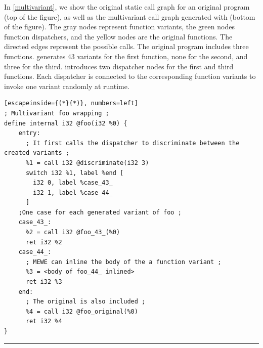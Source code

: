 In \autoref{multivariant}, we show the original static call graph for an original program (top of the figure), as well as the multivariant call graph generated with \tool (bottom of the figure).
The gray nodes represent function variants, the green nodes function dispatchers, and the yellow nodes are the original functions.
The directed edges represent the possible calls.
The original program includes three functions. \tool generates 43 variants for the first function, none for the second, and three for the third. 
\tool introduces two dispatcher nodes for the first and third functions. Each dispatcher is connected to the corresponding function variants to invoke one variant randomly at runtime.


\lstset{
    language=llvm,
    basicstyle=\footnotesize\ttfamily,
    columns=fullflexible,
    breaklines=true,
    numbers=none,
    stepnumber=1,
    float
}

\begin{minipage}[t]{0.9\linewidth}
\scriptsize
\centering
\noindent\begin{minipage}[b]{\linewidth}
    \begin{minipage}[t]{1\linewidth}
        \begin{lstlisting}[escapeinside={(*}{*)}, numbers=left]
; Multivariant foo wrapping ;
define internal i32 @foo(i32 %0) {
    entry:
      ; It first calls the dispatcher to discriminate between the created variants ;
      %1 = call i32 @discriminate(i32 3)
      switch i32 %1, label %end [
        i32 0, label %case_43_
        i32 1, label %case_44_
      ]
    ;One case for each generated variant of foo ;
    case_43_:                 
      %2 = call i32 @foo_43_(%0)
      ret i32 %2
    case_44_:
      ; MEWE can inline the body of the a function variant ;
      %3 = <body of foo_44_ inlined>
      ret i32 %3
    end:                                  
      ; The original is also included ;           
      %4 = call i32 @foo_original(%0)
      ret i32 %4
}
        \end{lstlisting}
    \end{minipage}%
    
    \noindent\rule{\linewidth}{0.4pt}
    \label{listing:multivariant_template}
\end{minipage}
\end{minipage}


